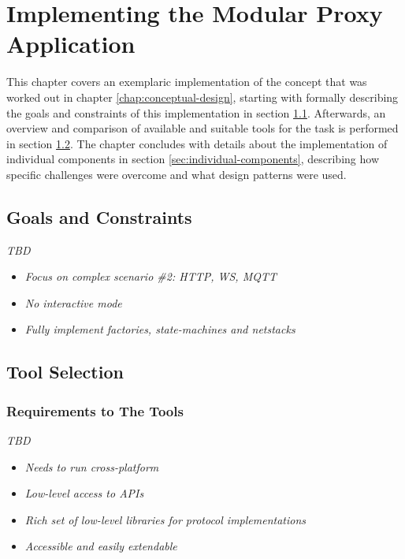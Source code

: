 \chapter{Implementing the Modular Proxy Application}
\label{chap:implementation}
This chapter covers an exemplaric implementation of the concept that was worked out in chapter \ref{chap:conceptual-design}, starting with formally describing the goals and constraints of this implementation in section \ref{sec:goals-constraints}. Afterwards, an overview and comparison of available and suitable tools for the task is performed in section \ref{sec:tool-selection}. The chapter concludes with details about the implementation of individual components in section \ref{sec:individual-components}, describing how specific challenges were overcome and what design patterns were used.

\section{Goals and Constraints}
\label{sec:goals-constraints}
\emph{TBD} %
\begin{itemize}
    \item \emph{Focus on complex scenario \#2: HTTP, WS, MQTT}
    \item \emph{No interactive mode}
    \item \emph{Fully implement factories, state-machines and netstacks}
\end{itemize}

\section{Tool Selection}
\label{sec:tool-selection}

\subsection{Requirements to The Tools}
\emph{TBD} %
\begin{itemize}
    \item \emph{Needs to run cross-platform}
    \item \emph{Low-level access to APIs}
    \item \emph{Rich set of low-level libraries for protocol implementations}
    \item \emph{Accessible and easily extendable}
\end{itemize}

